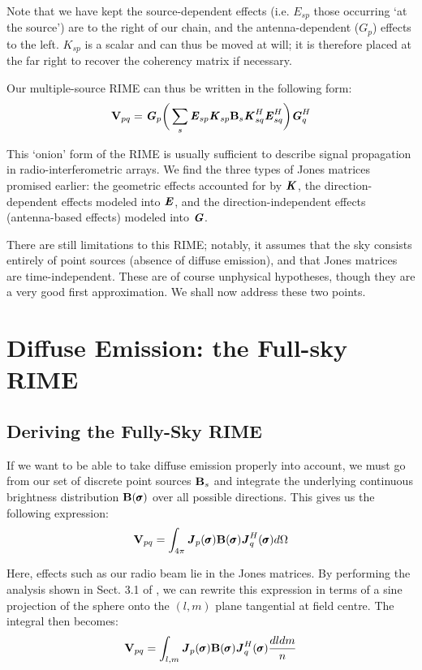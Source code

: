 \pg
Note that we have kept the source-dependent effects (i.e. $E_{sp}$ those occurring `at the source') are to the right of our chain, and the antenna-dependent ($G_p$) effects to the left. $K_{sp}$ is a scalar and can thus be moved at will; it is therefore placed at the far right to recover the coherency matrix if necessary.

\pg
Our multiple-source RIME can thus be written in the following form:
\begin{equation}\label{eq.multiple.source.RIME}
\textbf{V}_{pq} = \textbf{\emph{G}}_p \bigg( \sum_s \textbf{\emph{E}}_{sp} \textbf{\emph{K}}_{sp} \textbf{B}_{s} \textbf{\emph{K}}_{sq}^H \textbf{\emph{E}}_{sq}^H \bigg) \textbf{\emph{G}}_q^H
\end{equation}

\pg
This `onion' form of the RIME is usually sufficient to describe signal propagation in radio-interferometric arrays. We find the three types of Jones matrices promised earlier: the geometric effects accounted for by $\textbf{\emph{K}}$, the direction-dependent effects modeled into $\textbf{\emph{E}}$, and the direction-independent effects (antenna-based effects) modeled into $\textbf{\emph{G}}$.

\pg
There are still limitations to this RIME; notably, it assumes that the sky consists entirely of point sources (absence of diffuse emission), and that Jones matrices are time-independent. These are of course unphysical hypotheses, though they are a very good first approximation. We shall now address these two points.

\section{Diffuse Emission: the Full-sky RIME}
\label{section.RIME.FullSky}

\subsection{Deriving the Fully-Sky RIME}
\label{section.RIME.FullSky.derivation}
\pg
If we want to be able to take diffuse emission properly into account, we must go from our set of discrete point sources $\textbf{B}_s$ and integrate the underlying continuous brightness distribution $\textbf{B}(\pmb{\sigma})$ over all possible directions. This gives us the following expression:
\begin{equation}
\textbf{V}_{pq} = \int_{4\pi} \textbf{\emph{J}}_p(\pmb{\sigma}) \textbf{B}(\pmb{\sigma}) \textbf{\emph{J}}_q^H(\pmb{\sigma})d\Omega
\end{equation}

\pg
Here, effects such as our radio beam lie in the Jones matrices. By performing the analysis shown in Sect. 3.1 of , we can rewrite this expression in terms of a sine projection of the sphere onto the $(l,m)$ plane tangential at field centre. The integral then becomes:
\begin{equation}
\textbf{V}_{pq} = \int_{l,m} \textbf{\emph{J}}_p(\pmb{\sigma}) \textbf{B}(\pmb{\sigma}) \textbf{\emph{J}}_q^H(\pmb{\sigma})\frac{dl dm}{n}
\end{equation}

